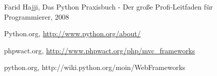 
\begin{thebibliography}{99}
Farid Hajji, Das Python Praxisbuch - Der große Profi-Leitfaden für
Programmierer, 2008

Python.org, \url{http://www.python.org/about/}

phpwact.org, \url{http://www.phpwact.org/php/mvc_frameworks}

python.org, http://wiki.python.org/moin/WebFrameworks
\end{thebibliography}


%
